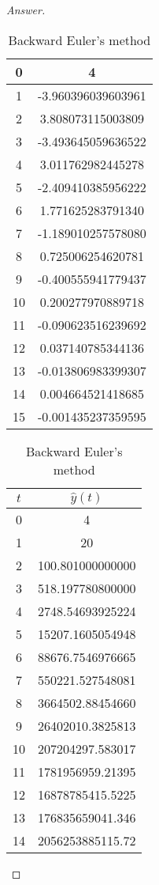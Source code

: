 \begin{proof}[Answer]
\begin{table}[H]
\begin{table}[htbp]
\begin{subtable}[t]{0.32\textwidth}
\begin{tabular}[t]{|c|c|}
		0	&	4					\\	\hline
		1	&	-3.960396039603961	\\	\hline
		2	&	3.808073115003809	\\	\hline
		3	&	-3.493645059636522	\\	\hline
		4	&	3.011762982445278	\\	\hline
		5	&	-2.409410385956222	\\	\hline
		6	&	1.771625283791340	\\	\hline
		7	&	-1.189010257578080	\\	\hline
		8	&	0.725006254620781	\\	\hline
		9	&	-0.400555941779437	\\	\hline
		10	&	0.200277970889718	\\	\hline
		11	&	-0.090623516239692	\\	\hline
		12	&	0.037140785344136	\\	\hline
		13	&	-0.013806983399307	\\	\hline
		14	&	0.004664521418685	\\	\hline
		15	&	-0.001435237359595	\\	\hline
		\end{tabular}
		\caption{Backward Euler's method}
	\end{subtable}
	\begin{subtable}[t]{0.32\textwidth}
		\centering
		\begin{tabular}[t]{|c|c|}
		\hline
		\(t\)	&	\(\hat{y}(t)\)	\\	\hline
		0	&	4					\\	\hline
		1	&	20					\\	\hline
		2	&	100.801000000000	\\	\hline
		3	&	518.197780800000	\\	\hline
		4	&	2748.54693925224	\\	\hline
		5	&	15207.1605054948	\\	\hline
		6	&	88676.7546976665	\\	\hline
		7	&	550221.527548081	\\	\hline
		8	&	3664502.88454660	\\	\hline
		9	&	26402010.3825813	\\	\hline
		10	&	207204297.583017	\\	\hline
		11	&	1781956959.21395	\\	\hline
		12	&	16878785415.5225	\\	\hline
		13	&	176835659041.346	\\	\hline
		14	&	2056253885115.72	\\	\hline

\end{tabular}
\end{subtable}
\end{table}
\end{table}
\end{proof}
